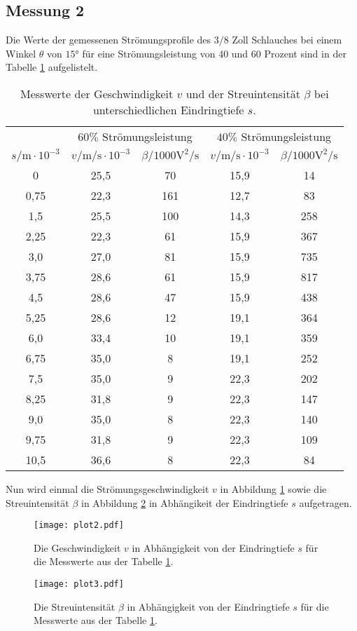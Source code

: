 \newpage
\subsection{Messung 2}
Die Werte der gemessenen Strömungsprofile des $3/8$ Zoll Schlauches bei einem Winkel
$\theta$ von $15\si{\degree}$ für eine Strömungsleistung von 40 und 60 Prozent sind in der Tabelle \ref{tab:mess2}
aufgelistelt.
\begin{table}
  \centering
  \caption{Messwerte der Geschwindigkeit $v$ und der Streuintensität $\beta$ bei unterschiedlichen Eindringtiefe $s$.}
  \label{tab:mess2}
  \begin{tabular}{c c c c c}
    \toprule
       & \multicolumn{2}{c}{ $60\%$ Strömungsleistung } &  \multicolumn{2}{c}{$40\%$ Strömungsleistung  } \\
     $s/\si{\meter}\cdot10^{-3}$ & $v/\si{\meter\per\second}\cdot10^{-3}$ & $\beta/1000\si{\volt\tothe{2}\per\second} $ & $v/\si{\meter\per\second}\cdot10^{-3}$ &$\beta/1000\si{\volt\tothe{2}\per\second}$ \\
     \midrule
     0     & 25,5 & 70  & 15,9 & 14\\
     0,75  & 22,3 & 161 & 12,7 & 83\\
     1,5   & 25,5 & 100 & 14,3 & 258\\
     2,25  & 22,3 & 61  & 15,9 & 367\\
     3,0   & 27,0 & 81  & 15,9 & 735\\
     3,75  & 28,6 & 61  & 15,9 & 817\\
     4,5   & 28,6 & 47  & 15,9 & 438\\
     5,25  & 28,6 & 12  & 19,1 & 364\\
     6,0   & 33,4 & 10  & 19,1 & 359\\
     6,75  & 35,0 & 8   & 19,1 & 252\\
     7,5   & 35,0 & 9   & 22,3 & 202\\
     8,25  & 31,8 & 9   & 22,3 & 147\\
     9,0   & 35,0 & 8   & 22,3 & 140\\
     9,75  & 31,8 & 9   & 22,3 & 109\\
     10,5  & 36,6 & 8   & 22,3 & 84\\
    \bottomrule
  \end{tabular}
\end{table}
\FloatBarrier
Nun wird einmal die Strömungsgeschwindigkeit $v$ in Abbildung \ref{fig:v2} sowie die Streuintensität
$\beta$ in Abbildung \ref{fig:b2} in Abhängikeit der Eindringtiefe $s$ aufgetragen.
\begin{figure}
  \texttt{[image: plot2.pdf]}
  \centering
   \caption{Die Geschwindigkeit $v$ in Abhängigkeit von der Eindringtiefe $s$ für die Messwerte aus der Tabelle \ref{tab:mess2}.}
  \label{fig:v2}
\end{figure}

\begin{figure}
  \texttt{[image: plot3.pdf]}
  \centering
   \caption{Die Streuintensität $\beta$ in Abhängigkeit von der Eindringtiefe $s$ für die Messwerte aus der Tabelle \ref{tab:mess2}.}
  \label{fig:b2}
\end{figure}
